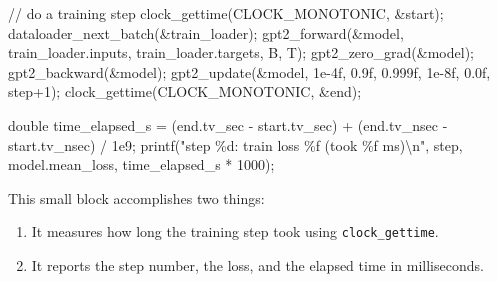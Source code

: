\documentclass[
  letterpaper,
  DIV=11,
  numbers=noendperiod]{scrreprt}
\newenvironment{Shaded}{\begin{snugshade}}{\end{snugshade}}
\newcommand{\BuiltInTok}[1]{\textcolor[rgb]{0.00,0.23,0.31}{#1}}
\newcommand{\CommentTok}[1]{\textcolor[rgb]{0.37,0.37,0.37}{#1}}
\newcommand{\DataTypeTok}[1]{\textcolor[rgb]{0.68,0.00,0.00}{#1}}
\newcommand{\DecValTok}[1]{\textcolor[rgb]{0.68,0.00,0.00}{#1}}
\newcommand{\FloatTok}[1]{\textcolor[rgb]{0.68,0.00,0.00}{#1}}
\newcommand{\NormalTok}[1]{\textcolor[rgb]{0.00,0.23,0.31}{#1}}
\newcommand{\OperatorTok}[1]{\textcolor[rgb]{0.37,0.37,0.37}{#1}}
\newcommand{\SpecialCharTok}[1]{\textcolor[rgb]{0.37,0.37,0.37}{#1}}
\newcommand{\StringTok}[1]{\textcolor[rgb]{0.13,0.47,0.30}{#1}}
\providecommand{\tightlist}{%
  \setlength{\itemsep}{0pt}\setlength{\parskip}{0pt}}
\begin{document}
\begin{Shaded}
\begin{Highlighting}[]
\CommentTok{// do a training step}
\NormalTok{clock\_gettime}\OperatorTok{(}\NormalTok{CLOCK\_MONOTONIC}\OperatorTok{,} \OperatorTok{\&}\NormalTok{start}\OperatorTok{);}
\NormalTok{dataloader\_next\_batch}\OperatorTok{(\&}\NormalTok{train\_loader}\OperatorTok{);}
\NormalTok{gpt2\_forward}\OperatorTok{(\&}\NormalTok{model}\OperatorTok{,}\NormalTok{ train\_loader}\OperatorTok{.}\NormalTok{inputs}\OperatorTok{,}\NormalTok{ train\_loader}\OperatorTok{.}\NormalTok{targets}\OperatorTok{,}\NormalTok{ B}\OperatorTok{,}\NormalTok{ T}\OperatorTok{);}
\NormalTok{gpt2\_zero\_grad}\OperatorTok{(\&}\NormalTok{model}\OperatorTok{);}
\NormalTok{gpt2\_backward}\OperatorTok{(\&}\NormalTok{model}\OperatorTok{);}
\NormalTok{gpt2\_update}\OperatorTok{(\&}\NormalTok{model}\OperatorTok{,} \FloatTok{1e{-}4}\BuiltInTok{f}\OperatorTok{,} \FloatTok{0.9}\BuiltInTok{f}\OperatorTok{,} \FloatTok{0.999}\BuiltInTok{f}\OperatorTok{,} \FloatTok{1e{-}8}\BuiltInTok{f}\OperatorTok{,} \FloatTok{0.0}\BuiltInTok{f}\OperatorTok{,}\NormalTok{ step}\OperatorTok{+}\DecValTok{1}\OperatorTok{);}
\NormalTok{clock\_gettime}\OperatorTok{(}\NormalTok{CLOCK\_MONOTONIC}\OperatorTok{,} \OperatorTok{\&}\NormalTok{end}\OperatorTok{);}

\DataTypeTok{double}\NormalTok{ time\_elapsed\_s }\OperatorTok{=} \OperatorTok{(}\NormalTok{end}\OperatorTok{.}\NormalTok{tv\_sec }\OperatorTok{{-}}\NormalTok{ start}\OperatorTok{.}\NormalTok{tv\_sec}\OperatorTok{)} \OperatorTok{+}
                        \OperatorTok{(}\NormalTok{end}\OperatorTok{.}\NormalTok{tv\_nsec }\OperatorTok{{-}}\NormalTok{ start}\OperatorTok{.}\NormalTok{tv\_nsec}\OperatorTok{)} \OperatorTok{/} \FloatTok{1e9}\OperatorTok{;}
\NormalTok{printf}\OperatorTok{(}\StringTok{"step }\SpecialCharTok{\%d}\StringTok{: train loss }\SpecialCharTok{\%f}\StringTok{ (took }\SpecialCharTok{\%f}\StringTok{ ms)}\SpecialCharTok{\textbackslash{}n}\StringTok{"}\OperatorTok{,}
\NormalTok{       step}\OperatorTok{,}\NormalTok{ model}\OperatorTok{.}\NormalTok{mean\_loss}\OperatorTok{,}\NormalTok{ time\_elapsed\_s }\OperatorTok{*} \DecValTok{1000}\OperatorTok{);}
\end{Highlighting}
\end{Shaded}

This small block accomplishes two things:

\begin{enumerate}
\def\labelenumi{\arabic{enumi}.}
\tightlist
\item
  It measures how long the training step took using
  \texttt{clock\_gettime}.
\item
  It reports the step number, the loss, and the elapsed time in
  milliseconds.
\end{enumerate}
\end{document}
